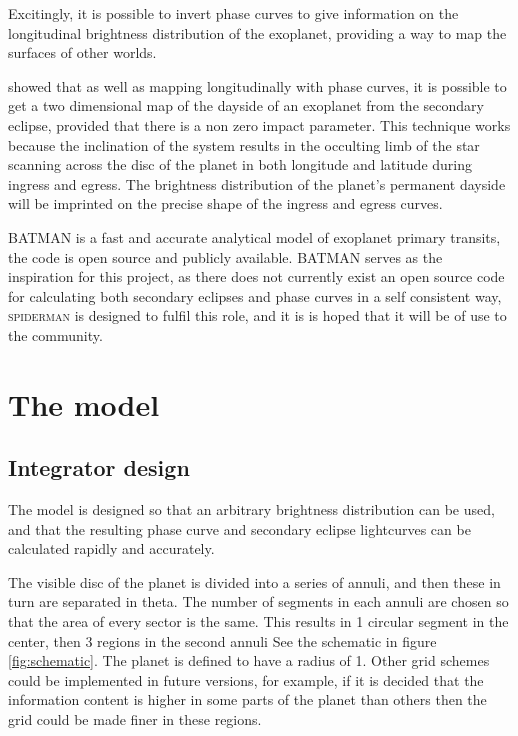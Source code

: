 \documentclass[a4paper,fleqn,usenatbib]{mnras}
\begin{document}
Excitingly, it is possible to invert phase curves to give information on the longitudinal brightness distribution of the exoplanet, providing a way to map the surfaces of other worlds. 

\cite{Majeau2012} showed that as well as mapping longitudinally with phase curves, it is possible to get a two dimensional map of the dayside of an exoplanet from the secondary eclipse, provided that there is a non zero impact parameter. This technique works because the inclination of the system results in the occulting limb of the star scanning across the disc of the planet in both longitude and latitude during ingress and egress. The brightness distribution of the planet's permanent dayside will be imprinted on the precise shape of the ingress and egress curves.

BATMAN \citep{Kreidberg2015a} is a fast and accurate analytical model of exoplanet primary transits, the code is open source and publicly available. BATMAN serves as the inspiration for this project, as there does not currently exist an open source code for calculating both secondary eclipses and phase curves in a self consistent way, \textsc{spiderman} is designed to fulfil this role, and it is is hoped that it will be of use to the community.

\section{The model}\label{sec:the model}

\subsection{Integrator design}\label{sec:integrator}

The model is designed so that an arbitrary brightness distribution can be used, and that the resulting phase curve and secondary eclipse lightcurves can be calculated rapidly and accurately. 

The visible disc of the planet is divided into a series of annuli, and then these in turn are separated in theta. The number of segments in each annuli are chosen so that the area of every sector is the same. This results in 1 circular segment in the center, then 3 regions in the second annuli See the schematic in figure \ref{fig:schematic}. The planet is defined to have a radius of 1. Other grid schemes could be implemented in future versions, for example, if it is decided that the information content is higher in some parts of the planet than others then the grid could be made finer in these regions.
\end{document}
